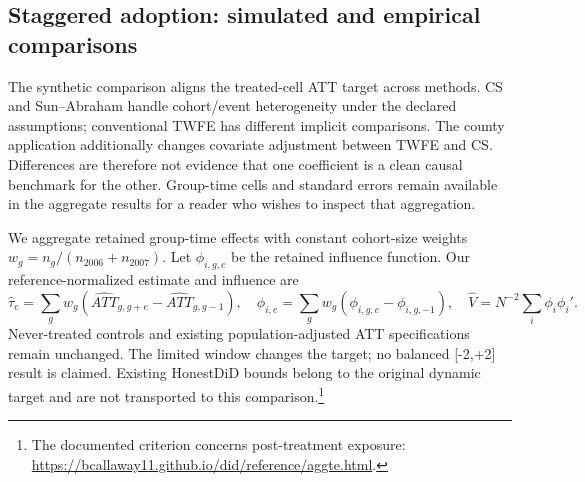 \subsection{Staggered adoption: simulated and empirical comparisons}


The synthetic comparison aligns the treated-cell ATT target across methods. CS and Sun--Abraham handle cohort/event heterogeneity under the declared assumptions; conventional TWFE has different implicit comparisons. The county application additionally changes covariate adjustment between TWFE and CS. Differences are therefore not evidence that one coefficient is a clean causal benchmark for the other. Group-time cells and standard errors remain available in the aggregate results for a reader who wishes to inspect that aggregation.

We aggregate retained group-time effects with constant cohort-size weights $w_g=n_g/(n_{2006}+n_{2007})$. Let $\phi_{i, g, e}$ be the retained influence function. Our reference-normalized estimate and influence are
\begin{equation}
 \widehat\tau_e=\sum_g w_g(\widehat{ATT}_{g, g+e}-\widehat{ATT}_{g, g-1}),\quad
 \phi_{i, e}=\sum_g w_g(\phi_{i, g, e}-\phi_{i, g,-1}),\quad
 \widehat V=N^{-2}\sum_i\phi_i\phi_i'.
\end{equation}
Never-treated controls and existing population-adjusted ATT specifications remain unchanged. The limited window changes the target; no balanced [-2,+2] result is claimed. Existing HonestDiD bounds belong to the original dynamic target and are not transported to this comparison.\footnote{The documented  criterion concerns post-treatment exposure: \url{https://bcallaway11.github.io/did/reference/aggte.html}.}
